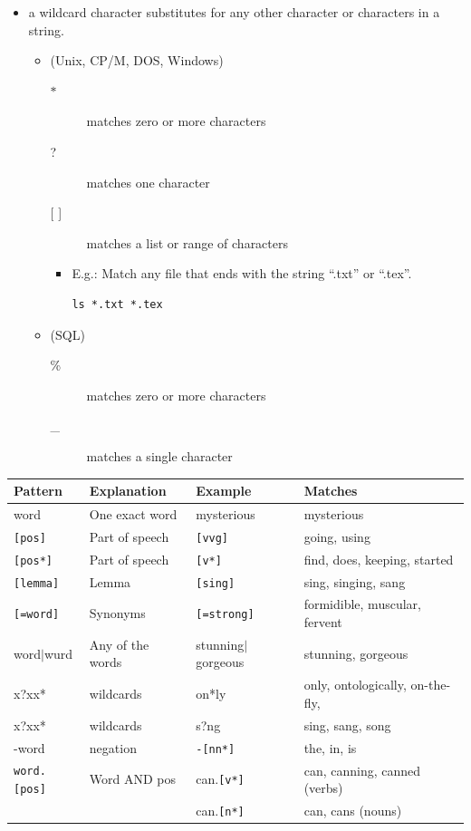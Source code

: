 \documentclass[a4paper,landscape,headrule,footrule,xetex]{foils}
\begin{document}
\MyLogo{}

\begin{itemize}
\item  a wildcard character  substitutes for any other character or characters in a string.
  \begin{itemize}
  \item {} (Unix, CP/M, DOS, Windows)
    \begin{description}
    \item[$*$] matches zero or more characters
    \item[?] matches one character
    \item[{[ ]}] matches a list or range of characters
    \end{description}
    \begin{itemize}
      \item E.g.:  Match any file that ends with the string ``.txt'' or ``.tex''.
\begin{verbatim}
ls *.txt *.tex
\end{verbatim}
     \end{itemize}
    \item {} (SQL)
    \begin{description}
    \item[\%]  matches zero or more characters
    \item[\_] matches a single character
    \end{description}
  \end{itemize}
\end{itemize}


\begin{small}
  \begin{tabular}{llll}
    Pattern & Explanation & Example & Matches \\ \hline
    word & One exact word & mysterious  & mysterious \\
    \texttt{[pos]} & Part of speech & \texttt{[vvg]} & going, using \\
    \texttt{[pos*]} & Part of speech & \texttt{[v*]} & find, does, keeping, started  \\
    \texttt{[lemma]} & Lemma & \texttt{[sing]} & sing, singing, sang \\
    \texttt{[=word]} & Synonyms & \texttt{[=strong]} & 	formidible, muscular, fervent \\
    word$|$wurd & Any of the words & stunning$|$gorgeous & stunning, gorgeous \\
    x?xx* & wildcards & on*ly & only, ontologically, on-the-fly, \\
    x?xx* & wildcards & s?ng & sing, sang, song \\
    -word & negation & \texttt{-[nn*]} & the, in, is \\
    \texttt{word.[pos]} & Word AND pos& can.\texttt{[v*]} &can, canning, canned (verbs)\\ 
& & can.\texttt{[n*]} & can, cans (nouns)\\
  \end{tabular}
\end{small}
\end{document}
